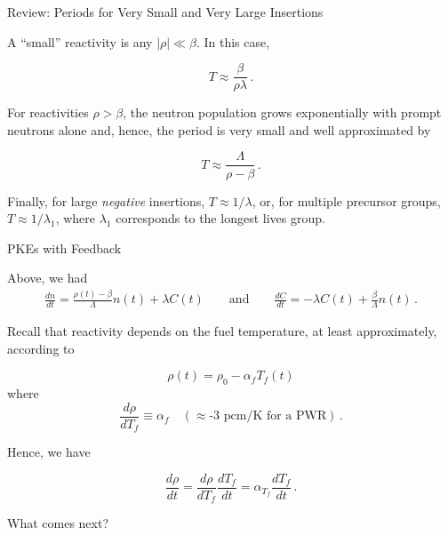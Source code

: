 \documentclass[aspectratio=1610]{beamer}
\begin{document}
\begin{frame}[fragile]{Review: Periods for Very Small and Very Large Insertions}

A ``small'' reactivity is any $|\rho| \ll \beta$.  In this case,                        

\begin{equation*}
\tag{FNRP 5.57}
 T \approx \frac{\beta}{\rho \lambda}\, .
\end{equation*}

For reactivities $\rho > \beta$, the neutron population grows exponentially with prompt neutrons alone and, hence, the period is very small and well approximated by

\begin{equation*}
\tag{FNRP 5.58}
 T \approx \frac{\Lambda}{\rho - \beta} \, .
\end{equation*}

Finally, for large {\it negative} insertions, $T \approx 1/\lambda$, or, for multiple precursor groups, $T \approx 1/\lambda_1$, where $\lambda_1$ corresponds to the longest lives group.

\end{frame}



\begin{frame}[fragile]{PKEs with Feedback}

Above, we had
\begin{align*}
 \frac{dn}{dt} = \frac{\rho(t)-\beta}{\Lambda}n(t) + \lambda C(t) \qquad \text{and} \qquad
 \frac{dC}{dt} = -\lambda C(t) + \frac{\beta}{\Lambda} n(t) \, .
\end{align*}

\vfill
\pause 

Recall that reactivity depends on the fuel temperature, at least approximately, according to 

\begin{equation*}
\rho(t) = \rho_0 - \alpha_{f}  T_f(t)
\end{equation*}
where
\begin{equation*}
  \frac{d\rho}{dT_f} \equiv \alpha_{f} \quad (\approx \text{-3 pcm/K for a PWR}) \, .
\end{equation*}

Hence, we have

\begin{equation*}
  \frac{d\rho}{dt} = \frac{d\rho}{dT_f} \frac{dT_f}{dt} = \alpha_{T_f} \frac{dT_f}{dt} \, .
\end{equation*}


What comes next?

\vfill

\end{frame}
\end{document}
